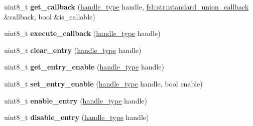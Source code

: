 \begin{DoxyCompactItemize}
\item 
\mbox{\label{classfsl_1_1os_1_1scheduler_a3d5df2c693c174e120b11cab6087c820}} 
uint8\+\_\+t {\bfseries get\+\_\+callback} (\mbox{\hyperlink{classfsl_1_1lg_1_1range__int}{handle\+\_\+type}} handle, \mbox{\hyperlink{classfsl_1_1str_1_1union__callback}{fsl\+::str\+::standard\+\_\+union\+\_\+callback}} \&callback, bool \&is\+\_\+callable)
\item 
\mbox{\label{classfsl_1_1os_1_1scheduler_a2674918c019a755b15d83df5c47b2477}} 
uint8\+\_\+t {\bfseries execute\+\_\+callback} (\mbox{\hyperlink{classfsl_1_1lg_1_1range__int}{handle\+\_\+type}} handle)
\item 
\mbox{\label{classfsl_1_1os_1_1scheduler_a7046ac58a0d54c206a56833efcfa389a}} 
uint8\+\_\+t {\bfseries clear\+\_\+entry} (\mbox{\hyperlink{classfsl_1_1lg_1_1range__int}{handle\+\_\+type}} handle)
\item 
\mbox{\label{classfsl_1_1os_1_1scheduler_a6e35cf7c18c6ae4b4738cef8364bf5c6}} 
uint8\+\_\+t {\bfseries get\+\_\+entry\+\_\+enable} (\mbox{\hyperlink{classfsl_1_1lg_1_1range__int}{handle\+\_\+type}} handle)
\item 
\mbox{\label{classfsl_1_1os_1_1scheduler_a0f97130444b64cb044728305cb0642b3}} 
uint8\+\_\+t {\bfseries set\+\_\+entry\+\_\+enable} (\mbox{\hyperlink{classfsl_1_1lg_1_1range__int}{handle\+\_\+type}} handle, bool enable)
\item 
\mbox{\label{classfsl_1_1os_1_1scheduler_acf890d81da3bcb5a17e4054df005ec50}} 
uint8\+\_\+t {\bfseries enable\+\_\+entry} (\mbox{\hyperlink{classfsl_1_1lg_1_1range__int}{handle\+\_\+type}} handle)
\item 
\mbox{\label{classfsl_1_1os_1_1scheduler_a900a454c4d2ddf57228f7b9a143951e4}} 
uint8\+\_\+t {\bfseries disable\+\_\+entry} (\mbox{\hyperlink{classfsl_1_1lg_1_1range__int}{handle\+\_\+type}} handle)
\item 
\mbox{\label{classfsl_1_1os_1_1scheduler_af1fb1f0be3ad551be6a4a8e1e8cdd77f}} 

\end{DoxyCompactItemize}
